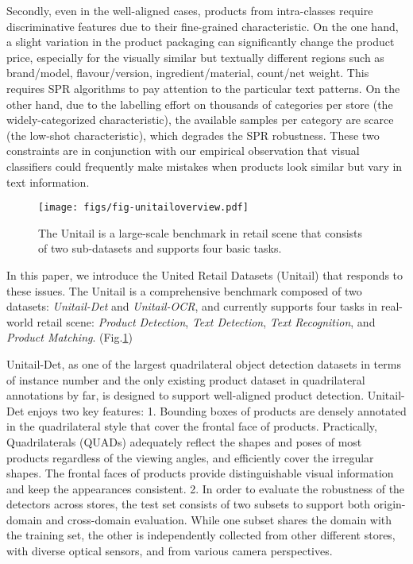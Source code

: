 \documentclass[runningheads]{llncs}
\begin{document}
Secondly, even in the well-aligned cases, products from intra-classes require discriminative features due to their fine-grained characteristic. On the one hand, a slight variation in the product packaging can significantly change the product price, especially for the visually similar but textually different regions such as brand/model, flavour/version, ingredient/material, count/net weight. This requires SPR algorithms to pay attention to the particular text patterns. On the other hand, due to the labelling effort on thousands of categories per store (the widely-categorized characteristic), the available samples per category are scarce (the low-shot characteristic), which degrades the SPR robustness. These two constraints are in conjunction with our empirical observation that visual classifiers could frequently make mistakes when products look similar but vary in text information.











\begin{figure}[t]
    \centering
    \texttt{[image: figs/fig-unitailoverview.pdf]}
    \caption{The Unitail is a large-scale benchmark in retail scene that consists of two sub-datasets and supports four basic tasks.}
    \label{fig:overview}
\end{figure}

In this paper, we introduce the United Retail Datasets (Unitail) that responds to these issues. The Unitail is a comprehensive benchmark composed of two datasets: \textit{Unitail-Det} and \textit{Unitail-OCR}, and currently supports four tasks in real-world retail scene: \textit{Product Detection}, \textit{Text Detection}, \textit{Text Recognition}, and \textit{Product Matching}. (Fig.\ref{fig:overview})

Unitail-Det, as one of the largest quadrilateral object detection datasets in terms of instance number and the only existing product dataset in quadrilateral annotations by far, is designed to support well-aligned product detection. Unitail-Det enjoys two key features: 1. Bounding boxes of products are densely annotated in the quadrilateral style that cover the frontal face of products. Practically, Quadrilaterals (QUADs) adequately reflect the shapes and poses of most products regardless of the viewing angles, and efficiently cover the irregular shapes. The frontal faces of products provide distinguishable visual information and keep the appearances consistent. 
2. In order to evaluate the robustness of the detectors across stores, the test set consists of two subsets to support both origin-domain and cross-domain evaluation. While one subset shares the domain with the training set, the other is independently collected from other different stores, with diverse optical sensors, and from various camera perspectives. 
\end{document}
